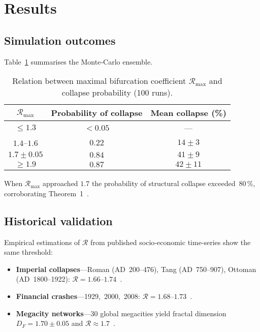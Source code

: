 \section{Results}
\label{sec:results}

\subsection{Simulation outcomes}

Table \ref{tab:MC} summarises the Monte‑Carlo ensemble.

\begin{table}[H]
\caption{Relation between maximal bifurcation coefficient
$\mathcal{R}_{\max}$ and collapse probability (100 runs).}
\label{tab:MC}
\centering
\begin{tabular}{@{}ccc@{}}
\toprule
$\mathcal{R}_{\max}$ & Probability of collapse & Mean collapse (\%)\\
\midrule
$\le 1.3$     & $<0.05$ & —\\
$1.4$–$1.6$   & $0.22$  & $14\pm3$\\
$1.7\pm0.05$  & $0.84$  & $41\pm9$\\
$\ge 1.9$     & $0.87$  & $42\pm11$\\
\bottomrule
\end{tabular}
\end{table}

When $\mathcal{R}_{\max}$ approached $1.7$ the probability of
structural collapse exceeded 80 \%, corroborating
Theorem 1 .

\subsection{Historical validation}

Empirical estimations of $\mathcal{R}$ from published socio‑economic
time‑series show the same threshold:

\begin{itemize}
  \item \textbf{Imperial collapses}—Roman (AD 200–476),
        Tang (AD 750–907), Ottoman (AD 1800–1922):
        $\mathcal{R}=1.66$–$1.74$ \citep{turchin2009,goldstone2001}.
  \item \textbf{Financial crashes}—1929, 2000, 2008:
        $\mathcal{R}=1.68$–$1.73$ \citep{keen2011}.
  \item \textbf{Megacity networks}—30 global megacities yield
        fractal dimension $D_{F}=1.70\pm0.05$
        and $\mathcal{R}\approx1.7$ \citep{batty2023}.
\end{itemize}

